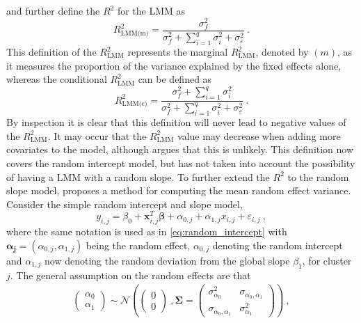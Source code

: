 and further define the $R^2$ for the LMM as
\begin{equation}
    R^2_{\text{LMM(m)}} = \frac{\sigma^2_f}{\sigma^2_f + \sum_{i=1}^{q}\sigma^2_{i} + \sigma^2_{\varepsilon}} \ .
\end{equation}
This definition of the $R^2_{\text{LMM}}$ represents the marginal $R^2_{\text{LMM}}$, denoted by $(m)$, as it measures the proportion of the variance explained by the fixed effects alone, whereas the conditional $R^2_\text{LMM}$ can be defined as 
\begin{equation}
    R^2_{\text{LMM(c)}} = \frac{\sigma^2_f + \sum_{i=1}^{q}\sigma^2_{i}}{\sigma^2_f + \sum_{i=1}^{q}\sigma^2_{i} + \sigma^2_{\varepsilon}} \ .
\end{equation}
By inspection it is clear that this definition will never lead to negative values of the $R^2_{\text{LMM}}$. 
It may occur that the $R^2_{\text{LMM}}$ value may decrease when adding more covariates to the model, although \citet{nakagawa2013general} argues that this is unlikely.
This definition now covers the random intercept model, but has not taken into account the possibility of having a LMM with a random slope. 
To further extend the $R^2$ to the random slope model, \citet{Johnson2014} proposes a method for computing the mean random effect variance.
Consider the simple random intercept and slope model,
\begin{equation}
    y_{i, j} = \beta_0 + \mathbf{x}_{i, j}^T\boldsymbol{\beta} + \alpha_{0, j} + \alpha_{1, j}x_{i, j} + \varepsilon_{i, j} \ ,
\end{equation}
where the same notation is used as in \eqref{eq:random_intercept} with $\boldsymbol{\alpha_j}=(\alpha_{0, j}, \alpha_{1, j})$ being the random effect, $\alpha_{0, j}$ denoting the random intercept and $\alpha_{1, j}$ now denoting the random deviation from the global slope $\beta_1$, for cluster $j$.
The general assumption on the random effects are that 
\begin{equation}
    \begin{aligned}
    \begin{pmatrix}
        \alpha_0 \\
        \alpha_{1}
    \end{pmatrix} 
    \sim \mathcal{N}\left( 
    \begin{pmatrix}
        0 \\
        0
    \end{pmatrix} \ ,
    \boldsymbol{\Sigma} =
    \begin{pmatrix}
        \sigma^2_{\alpha_0} & \sigma_{\alpha_0, \alpha_1} \\
        \sigma_{\alpha_0, \alpha_1} & \sigma^2_{\alpha_1}
    \end{pmatrix} \right)  \ ,
    \end{aligned}
\end{equation}
